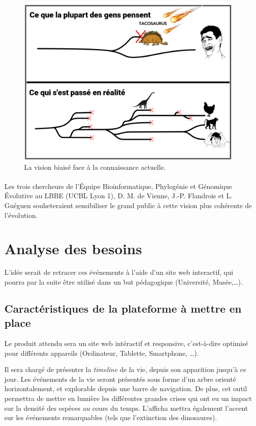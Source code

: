 \documentclass[a4paper]{article}
\begin{document}
	\begin{figure}[!h]
		\centering
		\includegraphics[width=12cm]{./img/illustr1.png}
		\caption{La vision biaisé face à la connaissance actuelle.}
		\label{comic1}
	\end{figure}

	\paragraph{}
	Les trois chercheurs de l'Équipe Bioinformatique, Phylogénie et Génomique Évolutive au LBBE (UCBL Lyon 1), D. M. de Vienne, J.-P. Flandrois et L. Guéguen souheteraient sensibiliser le grand public à cette vision plus cohérente de l'évolution. 

\newpage
\section{Analyse des besoins}

	L'idée serait de retracer ces événements à l'aide d'un site web interactif, qui pourra par la suite être utilisé dans un but pédagogique (Université, Musée,\ldots).

	\subsection{Caractéristiques de la plateforme à mettre en place}
		Le produit attendu sera un site web intéractif et responsive, c'est-à-dire optimisé pour différents appareils (Ordinateur, Tablette, Smartphone, \ldots).
		

		Il sera chargé de présenter la \emph{timeline} de la vie, depuis son apparition jusqu'à ce jour. Les événements de la vie seront présentés sous forme d'un arbre orienté horizontalement, et explorable depuis une barre de navigation.	De plus, cet outil permettra de mettre en lumière les différentes grandes crises qui ont eu un impact sur la densité des espèces au cours du temps. L'afficha mettra également l'accent sur les événements remarquables (tels que l'extinction des dinosaures). 
\end{document}
